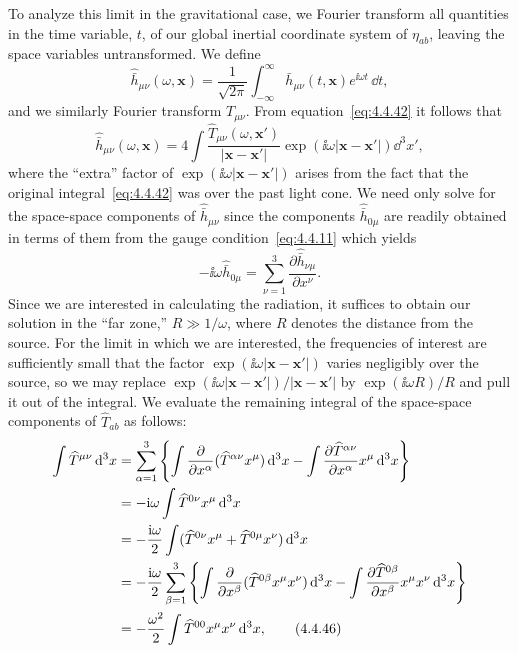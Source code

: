 To analyze this limit in the gravitational case, we Fourier transform all quantities
in the time variable, \(t\), of our global inertial coordinate system of \(\eta_{ab}\),
leaving the space variables untransformed. We define
\begin{equation}
  \widehat{\bar h}_{\mu\nu}(\omega,\mathbf{x})
    =\frac{1}{\sqrt{2\pi}}\int_{-\infty}^{\infty}
      \bar h_{\mu\nu}(t,\mathbf{x})e^{\ii\omega t}\,\dd t ,
  \tag{4.4.43}\label{eq:4.4.43}
\end{equation}
and we similarly Fourier transform \(T_{\mu\nu}\). From
equation~\eqref{eq:4.4.42} it follows that
\begin{equation}
  \widehat{\bar h}_{\mu\nu}(\omega,\mathbf{x})=4\int
    \frac{\widehat T_{\mu\nu}(\omega,\mathbf{x}')}
      {\lvert\mathbf{x}-\mathbf{x}'\rvert}
    \exp\!\left(\ii\omega\lvert\mathbf{x}-\mathbf{x}'\rvert\right)\dd^3x' ,
  \tag{4.4.44}\label{eq:4.4.44}
\end{equation}
where the ``extra'' factor of
\(\exp(\ii\omega\lvert\mathbf{x}-\mathbf{x}'\rvert)\) arises from the fact that the
original integral~\eqref{eq:4.4.42} was over the past light cone. We need only
solve for the space-space components of \(\widehat{\bar h}_{\mu\nu}\) since the
components \(\widehat{\bar h}_{0\mu}\) are readily obtained in terms of them from
the gauge condition~\eqref{eq:4.4.11} which yields
\begin{equation}
  -\ii\omega\widehat{\bar h}_{0\mu}
    =\sum_{\nu=1}^{3}\frac{\partial\widehat{\bar h}_{\nu\mu}}
      {\partial x^\nu} .
  \tag{4.4.45}\label{eq:4.4.45}
\end{equation}
Since we are interested in calculating the radiation, it suffices to obtain our
solution in the ``far zone,'' \(R\gg1/\omega\), where \(R\) denotes the distance
from the source. For the limit in which we are interested, the frequencies of interest
are sufficiently small that the factor
\(\exp(\ii\omega\lvert\mathbf{x}-\mathbf{x}'\rvert)\) varies negligibly over the source, so
we may replace
\(\exp(\ii\omega\lvert\mathbf{x}-\mathbf{x}'\rvert)/\lvert\mathbf{x}-\mathbf{x}'\rvert\) by
\(\exp(\ii\omega R)/R\) and pull it out of the integral. We evaluate the remaining
integral of the space-space components of \(\widehat T_{ab}\) as follows:
\begin{align}
  \int\widehat T^{\mu\nu}\dd^3x
    &=\sum_{\alpha=1}^{3}\left\{
      \int\frac{\partial}{\partial x^\alpha}
        (\widehat T^{\alpha\nu}x^\mu)\dd^3x
      -\int\frac{\partial\widehat T^{\alpha\nu}}{\partial x^\alpha}
        x^\mu\dd^3x\right\}\notag\\
    &=-\ii\omega\int\widehat T^{0\nu}x^\mu\dd^3x\notag\\
    &=-\frac{\ii\omega}{2}\int
      (\widehat T^{0\nu}x^\mu+\widehat T^{0\mu}x^\nu)\dd^3x\notag\\
    &=-\frac{\ii\omega}{2}\sum_{\beta=1}^{3}\left\{
      \int\frac{\partial}{\partial x^\beta}
        (\widehat T^{0\beta}x^\mu x^\nu)\dd^3x
      -\int\frac{\partial\widehat T^{0\beta}}{\partial x^\beta}
        x^\mu x^\nu\dd^3x\right\}\notag\\
    &=-\frac{\omega^2}{2}\int\widehat T^{00}x^\mu x^\nu\dd^3x ,
  \tag{4.4.46}\label{eq:4.4.46}
\end{align}
